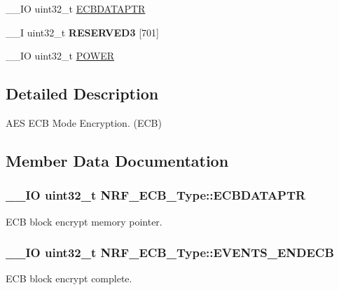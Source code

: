 \begin{DoxyCompactItemize}
\item 
\+\_\+\+\_\+\+I\+O uint32\+\_\+t \hyperlink{struct_n_r_f___e_c_b___type_a7b13aba64a9ad09b2077bd737ccc6a50}{E\+C\+B\+D\+A\+T\+A\+P\+T\+R}
\item 
\hypertarget{struct_n_r_f___e_c_b___type_a1d802ad9efb78642a6c446e261143ecd}{}\+\_\+\+\_\+\+I uint32\+\_\+t {\bfseries R\+E\+S\+E\+R\+V\+E\+D3} \mbox{[}701\mbox{]}\label{struct_n_r_f___e_c_b___type_a1d802ad9efb78642a6c446e261143ecd}

\item 
\+\_\+\+\_\+\+I\+O uint32\+\_\+t \hyperlink{struct_n_r_f___e_c_b___type_a30e3cd909368443bec71ff7acf9ebf84}{P\+O\+W\+E\+R}
\end{DoxyCompactItemize}


\subsection{Detailed Description}
A\+E\+S E\+C\+B Mode Encryption. (E\+C\+B) 

\subsection{Member Data Documentation}
\hypertarget{struct_n_r_f___e_c_b___type_a7b13aba64a9ad09b2077bd737ccc6a50}{}
\subsubsection[{E\+C\+B\+D\+A\+T\+A\+P\+T\+R}]{\setlength{\rightskip}{0pt plus 5cm}\+\_\+\+\_\+\+I\+O uint32\+\_\+t N\+R\+F\+\_\+\+E\+C\+B\+\_\+\+Type\+::\+E\+C\+B\+D\+A\+T\+A\+P\+T\+R}\label{struct_n_r_f___e_c_b___type_a7b13aba64a9ad09b2077bd737ccc6a50}
E\+C\+B block encrypt memory pointer. \hypertarget{struct_n_r_f___e_c_b___type_ac742b75da13533955fbc6d478ce7612b}{}
\subsubsection[{E\+V\+E\+N\+T\+S\+\_\+\+E\+N\+D\+E\+C\+B}]{\setlength{\rightskip}{0pt plus 5cm}\+\_\+\+\_\+\+I\+O uint32\+\_\+t N\+R\+F\+\_\+\+E\+C\+B\+\_\+\+Type\+::\+E\+V\+E\+N\+T\+S\+\_\+\+E\+N\+D\+E\+C\+B}\label{struct_n_r_f___e_c_b___type_ac742b75da13533955fbc6d478ce7612b}
E\+C\+B block encrypt complete. \hypertarget{struct_n_r_f___e_c_b___type_a08b5d7f910229e3a7945d7aa50c21936}{}
